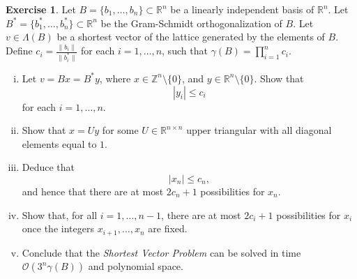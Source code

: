 \documentclass[12pt,a4paper]{article}
\theoremstyle{plain}
\newtheorem*{Sol*}{Solution}
\theoremstyle{definition}
\newtheorem{Ex}{Exercise}
\def \R {\mathbb R}
\def \Z {\mathbb Z}
\newif\ifsolutions
\newcommand{\exercise}[2]{
			\begin{Ex} #1 \end{Ex}
			\ifsolutions  \begin{Sol*} #2 \end{Sol*} \bigskip \else \bigskip  \fi
		}
\begin{document}
\exercise{
	Let $B = \{b_1,\dots,b_n\} \subset \R^n$ be a linearly independent basis of $\R^n$. 
	Let $B^* = \{b_1^*,\dots,b_n^*\} \subset \R^n$ be the Gram-Schmidt orthogonalization of $B$.
	Let $v \in \Lambda(B)$ be a shortest vector of the lattice generated by the elements of $B$.
	Define $c_i =  \frac{\| b_i \|}{\| b_i^* \|}$ for each $i = 1, \dots, n$, such that $\gamma(B) = \prod_{i=1}^n c_i$.
	\begin{enumerate}[i)]
		\item Let $v = Bx = B^*y$, where $x \in \Z^{n} \setminus \{0\}$, and $y \in \R^{n} \setminus \{0\}$.
		Show that
			\[ | y_i | \leq c_i \]
		for each $i=1, \dots, n$.
		\item Show that $ x = U y$ for some $U \in \R^{n \times n}$ upper triangular with all diagonal elements equal to $1$.
		\item Deduce that 
			\[ | x_n | \leq c_n, \]
		and hence that there are at most $2c_n + 1$ possibilities for $x_n$.
		\item Show that, for all $i=1, \dots, n-1$, there are at most $2 c_i + 1$ possibilities for $x_i$ once the integers $x_{i+1}, \dots, x_n$ are fixed.
		\item Conclude that the \emph{Shortest Vector Problem} can be solved in time $\mathcal{O}\left(3^n \gamma(B)\right)$ and polynomial space.
	\end{enumerate}
}
{}
\end{document}
